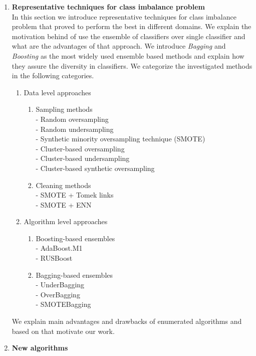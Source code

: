 \documentclass[a4paper]{article}
\begin{document}
\begin{enumerate}[I]
\item \textbf{Representative techniques for class imbalance problem}\\
In this section we introduce representative techniques for class imbalance problem that proved to perform the best in different domains. We explain the motivation behind of use the ensemble of classifiers over single classifier and what are the advantages of that approach. We introduce \textit{Bagging} and \textit{Boosting} as the most widely used ensemble based methods and explain how they assure the diversity in classifiers. We categorize the investigated methods in the following categories.
		\begin{enumerate}[I]
		\item Data level approaches
			\begin{enumerate}[1.]
			\item Sampling methods \\
			- Random oversampling\\
			- Random undersampling\\
			- Synthetic minority oversampling technique (SMOTE)\\
			- Cluster-based oversampling\\
			- Cluster-based undersampling\\
			- Cluster-based synthetic oversampling\\
			\item Cleaning methods\\
			- SMOTE + Tomek links\\
			- SMOTE + ENN
			\end{enumerate}
		\item Algorithm level approaches
			\begin{enumerate}[1.]
			\item Boosting-based ensembles \\
			- AdaBoost.M1\\
			- RUSBoost
			\item Bagging-based ensembles\\
			- UnderBagging\\
			- OverBagging \\
			- SMOTEBagging
			\end{enumerate}
		\end{enumerate}
We explain main advantages and drawbacks of enumerated algorithms and based on that motivate our work.

\item \textbf{New algorithms}


\end{enumerate}
\end{document}
